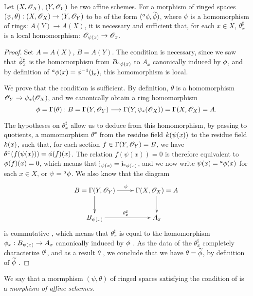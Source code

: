 \begin{thm}[1.7.3]
\label{1.1.7.3}
Let $(X,\mathscr{O}_X)$, $(Y,\mathscr{O}_Y)$ be two affine schemes. For a morphism of ringed spaces
$(\psi,\theta):(X,\mathscr{O}_X)\to(Y,\mathscr{O}_Y)$ to be of the form $({}^a\phi,\widetilde{\phi})$,
where $\phi$ is a homomorphism of rings: $A(Y)\to A(X)$, it is necessary and sufficient
that, for each $x\in X$, $\theta_x^\sharp$ is a local homomorphism: $\mathscr{O}_{\psi(x)}\to\mathscr{O}_x$.
\end{thm}

\begin{proof}
\label{proof-1.1.7.3}
Set $A=A(X)$, $B=A(Y)$. The condition is necessary, since we saw  that
$\widetilde{\phi}_x^\sharp$ is the homomorphism from $B_{{}^a\phi(x)}$ to $A_x$ canonically
induced by $\phi$, and by definition of ${}^a\phi(x)=\phi^{-1}(\mathfrak{j}_x)$, this
homomorphism is local.

We prove that the condition is sufficient. By definition, $\theta$ is a homomorphism
$\mathscr{O}_Y\to\psi_*(\mathscr{O}_X)$, and we canonically obtain a ring homomorphism
\[
  \phi=\Gamma(\theta):B=\Gamma(Y,\mathscr{O}_Y)
  \longrightarrow\Gamma(Y,\psi_*(\mathscr{O}_X))=\Gamma(X,\mathscr{O}_X)=A.
\]

The hypotheses on $\theta_x^\sharp$ allow us to deduce from this homomorphism, by passing to
quotients, a momomorphism $\theta^x$ from the residue field $k(\psi(x))$ to the residue
field $k(x)$, such that, for each section $f\in\Gamma(Y,\mathscr{O}_Y)=B$, we have
$\theta^x(f(\psi(x)))=\phi(f)(x)$. The relation $f(\psi(x))=0$ is therefore equivalent to
$\phi(f)(x)=0$, which means that $\mathfrak{j}_{\psi(x)}=\mathfrak{j}_{{}^a\phi(x)}$, and
we now write $\psi(x)={}^a\phi(x)$ for each $x\in X$, or $\psi={}^a\phi$. We also know that
the diagram
\[
  \xymatrix{
    B=\Gamma(Y,\OO_Y)\ar[r]^\vphi\ar[d] &
    \Gamma(X,\OO_X)=A\ar[d]\\
    B_{\psi(x)}\ar[r]^{\theta_x^\sharp} &
    A_x
  }
\]
is commutative , which means that $\theta_x^\sharp$ is equal to the
homomorphism $\phi_x:B_{\psi(x)}\to A_x$ canonically induced by $\phi$ .
As the data of the $\theta_x^\sharp$ completely characterize $\theta^\sharp$, and as a result
$\theta$ , we conclude that we have $\theta=\widetilde{\phi}$, by
definition of $\widetilde{\phi}$ .
\end{proof}

We say that a mormphism $(\psi,\theta)$ of ringed spaces satisfying the condition of
 is a {\em morphism of affine schemes}.

